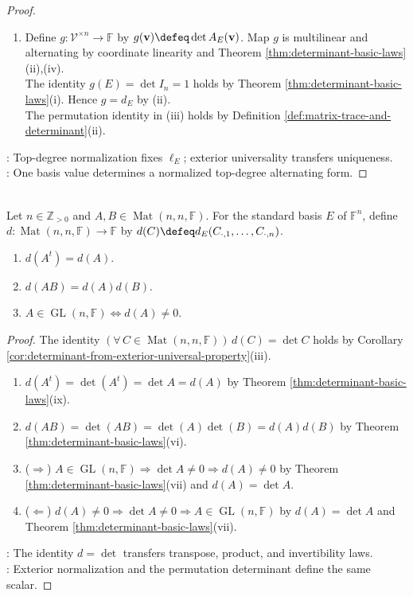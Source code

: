 \begin{corollary}
\begin{proof}
\begin{enumerate}[label=(\roman*)]
\item Define $g:\mathcal{V}^{\times n}\to\mathbb{F}$ by $g(\mathbf{v})\defeq\det A_E(\mathbf{v})$. Map $g$ is multilinear and alternating by coordinate linearity and Theorem \ref{thm:determinant-basic-laws}(ii),(iv).\\
The identity $g(E)=\det I_n=1$ holds by Theorem \ref{thm:determinant-basic-laws}(i). Hence $g=d_E$ by (ii).\\
The permutation identity in (iii) holds by Definition \ref{def:matrix-trace-and-determinant}(ii).
\end{enumerate}
: Top-degree normalization fixes $\ell_E$; exterior universality transfers uniqueness.\\
: One basis value determines a normalized top-degree alternating form.
\end{proof}
\end{corollary}

\begin{corollary} \label{cor:exterior-determinant-basic-properties} \\
Let $n\in\mathbb{Z}_{>0}$ and $A,B\in\operatorname{Mat}(n,n,\mathbb{F})$. For the standard basis $E$ of $\mathbb{F}^n$, define $d:\operatorname{Mat}(n,n,\mathbb{F})\to\mathbb{F}$ by $d(C)\defeq d_E(C_{\cdot,1},\ldots,C_{\cdot,n})$.
\begin{enumerate}[label=(\roman*)]
\setlength{\itemsep}{0pt}
\item $d(A^t)=d(A)$.
\item $d(AB)=d(A)d(B)$.
\item $A\in\operatorname{GL}(n,\mathbb{F})\Longleftrightarrow d(A)\neq0$.
\end{enumerate}
\begin{proof}
The identity $(\forall\,C\in\operatorname{Mat}(n,n,\mathbb{F}))\,d(C)=\det C$ holds by Corollary \ref{cor:determinant-from-exterior-universal-property}(iii).
\begin{enumerate}[label=(\roman*)]
\setlength{\itemsep}{0pt}
\item[$(i)$] $d(A^t)=\det(A^t)=\det A=d(A)$ by Theorem \ref{thm:determinant-basic-laws}(ix).
\item[$(ii)$] $d(AB)=\det(AB)=\det(A)\det(B)=d(A)d(B)$ by Theorem \ref{thm:determinant-basic-laws}(vi).
\item[$(iii)$] ($\Rightarrow$) $A\in\operatorname{GL}(n,\mathbb{F})\Rightarrow\det A\neq0\Rightarrow d(A)\neq0$ by Theorem \ref{thm:determinant-basic-laws}(vii) and $d(A)=\det A$.
\item[$(iii)$] ($\Leftarrow$) $d(A)\neq0\Rightarrow\det A\neq0\Rightarrow A\in\operatorname{GL}(n,\mathbb{F})$ by $d(A)=\det A$ and Theorem \ref{thm:determinant-basic-laws}(vii).
\end{enumerate}
: The identity $d=\det$ transfers transpose, product, and invertibility laws.\\
: Exterior normalization and the permutation determinant define the same scalar.
\end{proof}
\end{corollary}
